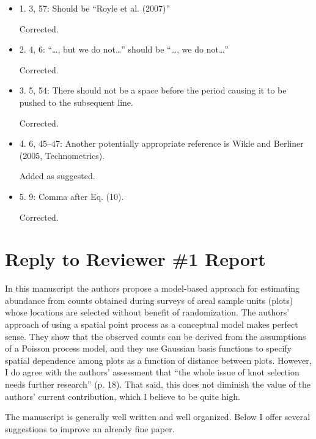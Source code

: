 \documentclass[12pt, titlepage]{article}
\begin{document}
\begin{itemize}
\item {\color{red!70!black} 1. 3, 57: Should be ``Royle et al. (2007)'' }

  Corrected.

\item {\color{red!70!black} 2. 4, 6: ``\dots, but we do not\dots'' should be ``\dots, we do not\dots''}

  Corrected.

\item {\color{red!70!black} 3. 5, 54: There should not be a space before the period causing it to be pushed to the subsequent line.}

  Corrected.

\item {\color{red!70!black} 4. 6, 45--47:  Another potentially appropriate reference is Wikle and Berliner (2005, Technometrics).}

  Added as suggested.

\item {\color{red!70!black} 5. 9: Comma after Eq. (10).}

  Corrected.

\end{itemize}



\section{Reply to Reviewer \#1 Report}

{\color{red!70!black}
In this manuscript the authors propose a model-based approach for estimating abundance from counts
obtained during surveys of areal sample units (plots) whose locations are selected without benefit of
randomization. The authors’ approach of using a spatial point process as a conceptual model makes
perfect sense. They show that the observed counts can be derived from the assumptions of a Poisson
process model, and they use Gaussian basis functions to specify spatial dependence among plots as a
function of distance between plots. However, I do agree with the authors’ assessment that “the whole
issue of knot selection needs further research” (p. 18). That said, this does not diminish the value of
the authors’ current contribution, which I believe to be quite high.

The manuscript is generally well written and well organized. Below I offer several suggestions to
improve an already fine paper.
}
\end{document}
